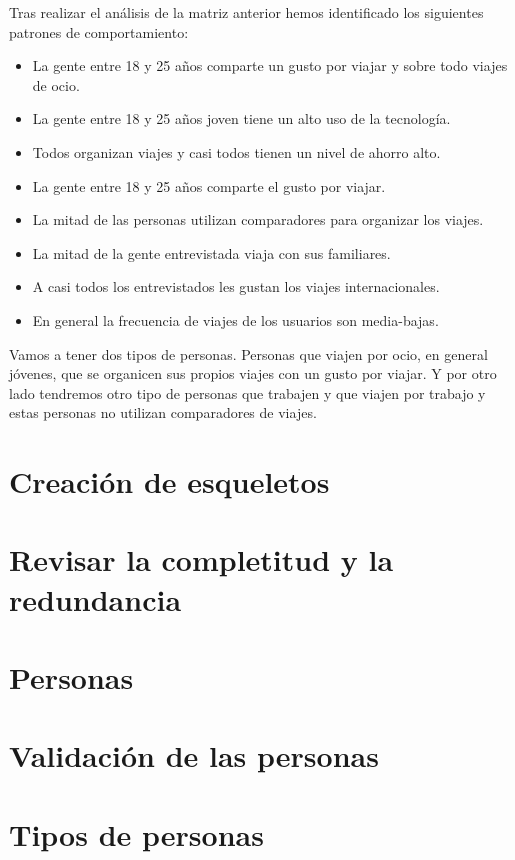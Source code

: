 Tras realizar el análisis de la matriz anterior hemos identificado los siguientes patrones de comportamiento:
\begin{itemize}
    \item La gente entre 18 y 25 años comparte un gusto por viajar y sobre todo viajes de ocio.
    \item La gente entre 18 y 25 años joven tiene un alto uso de la tecnología.
    \item Todos organizan viajes y casi todos tienen un nivel de ahorro alto. 
    \item La gente entre 18 y 25 años comparte el gusto por viajar.
    \item La mitad de las personas utilizan comparadores para organizar los viajes.
    \item La mitad de la gente entrevistada viaja con sus familiares.
    \item A casi todos los entrevistados les gustan los viajes internacionales.
    \item En general la frecuencia de viajes de los usuarios son media-bajas.
\end{itemize}

Vamos a tener dos tipos de personas. Personas que viajen por ocio, en general jóvenes, que se organicen sus propios viajes con un gusto por viajar. Y por otro lado tendremos otro tipo de personas que trabajen y que viajen por trabajo y estas personas no utilizan comparadores de viajes.

\section{Creación de esqueletos}
\section{Revisar la completitud y la redundancia}
\section{Personas}
\section{Validación de las personas}
\section{Tipos de personas}